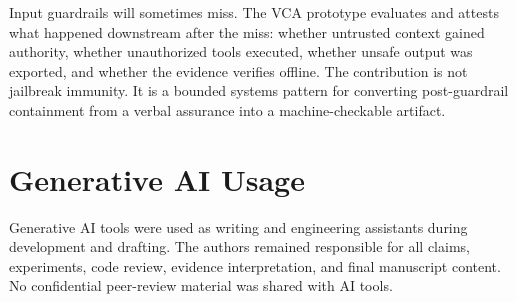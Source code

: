 \documentclass[sigconf,anonymous,review]{acmart}
\newcommand{\system}{VCA prototype}
\begin{document}
Input guardrails will sometimes miss. The \system{} evaluates and attests what happened downstream after the miss: whether untrusted context gained authority, whether unauthorized tools executed, whether unsafe output was exported, and whether the evidence verifies offline. The contribution is not jailbreak immunity. It is a bounded systems pattern for converting post-guardrail containment from a verbal assurance into a machine-checkable artifact.




\section*{Generative AI Usage}

Generative AI tools were used as writing and engineering assistants during development and drafting. The authors remained responsible for all claims, experiments, code review, evidence interpretation, and final manuscript content. No confidential peer-review material was shared with AI tools.
\end{document}
